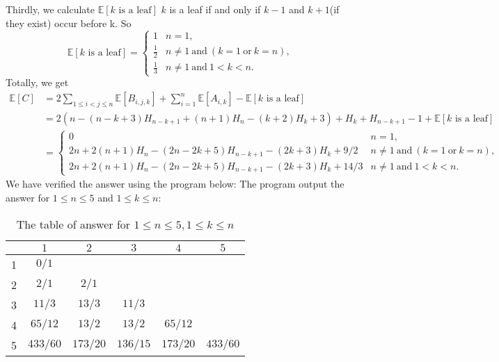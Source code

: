 		 Thirdly, we calculate $\displaystyle \mathbb{E}[k\text{~is~a~leaf}]$
		 $k$ is a leaf if and only if $k - 1$ and $k + 1$(if they exist) occur before k. So
		 \[
			\mathbb{E}[k\text{~is~a~leaf}] = 
			\begin{cases}
				1 & n = 1,\\
				\frac{1}{2} &n \neq 1~\text{and}~(k = 1~\text{or}~k = n),\\
				\frac{1}{3} &n \neq 1~\text{and}~1 < k < n.
			\end{cases}
		 \]
		 Totally, we get
		 \begin{align*}
			\mathbb{E}[C]	&= 2\sum_{1 \leq i < j \leq n} \mathbb{E}[B_{i,j,k}] + \sum_{i = 1}^{n} \mathbb{E}[A_{i,k}] - \mathbb{E}[k\text{~is~a~leaf}]\\
							&= 2(n-(n-k+3)H_{n-k+1}+(n+1)H_n-(k+2)H_{k}+3) + H_k + H_{n - k + 1} - 1 + \mathbb{E}[k\text{~is~a~leaf}]\\
							&=
							\begin{cases}
								0 & n = 1,\\
								2n + 2(n + 1)H_n - (2n - 2k + 5)H_{n - k + 1} - (2k + 3)H_k + {9 / 2} &n \neq 1~\text{and}~(k = 1~\text{or}~k = n),\\
								2n + 2(n + 1)H_n - (2n - 2k + 5)H_{n - k + 1} - (2k + 3)H_k + {14 / 3} &n \neq 1~\text{and}~1 < k < n.
							\end{cases}
		\end{align*}
		We have verified the answer using the program below:
		\noindent The program output the answer for $1 \leq n \leq 5$ and $1 \leq k \leq n$:
		\begin{table}[H]
			\centering
			\begin{tabular}{|c|c|c|c|c|c|}
			\hline
			\diagbox[height=0.8cm,width=1.5cm]{$n$}{$k$} & $1$ & $2$ & $3$ & $4$ & $5$\\
			\hline 1 & $0 / 1$ & & & &\\
			\hline 2 & $2 / 1$ & $2 / 1$ & & &\\
			\hline 3 & $11 / 3$ & $13 / 3$ & $11 / 3$ & &\\
			\hline 4 & $65 / 12$ & $13 / 2$ & $13 / 2$ & $65 / 12$ &\\
			\hline 5 & $433 / 60$ & $173 / 20$ & $136 / 15$ & $173 / 20$ & $433 / 60$\\
			\hline
			\end{tabular}
			\caption{The table of answer for $1 \leq n \leq 5, 1 \leq k \leq n$}
		\end{table}
